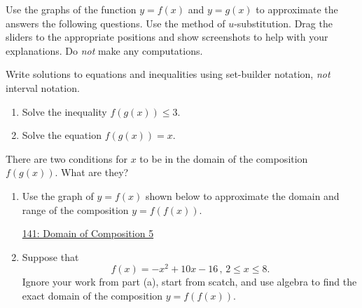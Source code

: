 \documentclass{ximera}
\begin{document}
\begin{question} \label{Ex:55rtggytt}
Use the graphs of the function $y=f(x)$ and $y=g(x)$ to approximate the answers the following questions. Use the method of $u$-substitution. Drag the sliders to the appropriate positions and show screenshots to help with your explanations. Do \emph{not} make any computations.

Write solutions to equations and inequalities using set-builder notation, \emph{not} interval notation.

\begin{onlineOnly}
    \begin{center}
\end{center}
\end{onlineOnly}


\begin{enumerate}


\item Solve the inequality $f(g(x))\leq 3$.

\item Solve the equation $f(g(x))=x$.

\end{enumerate}
\end{question}


\begin{question}   \label{Q1:Comp}
There are two conditions for $x$ to be in the domain of the composition $f(g(x))$. What are they?
\end{question}


\begin{example}  \label{Ederg4t4r5}
\begin{enumerate}

\item Use the graph of $y=f(x)$ shown below to approximate the domain and range of the composition $y=f(f(x))$.


\begin{onlineOnly}
    \begin{center}
\end{center}
\end{onlineOnly}

\href{https://www.desmos.com/calculator/d6zcmotesc}{141: Domain of Composition 5}

\item Suppose that 
\[
       f(x) = -x^2 +10x - 16 \, , \, 2\leq x \leq 8 .
\]
Ignore your work from part (a), start from scatch, and use algebra to find the exact domain of the composition $y=f(f(x))$.

\end{enumerate}
\end{example}
\end{document}
